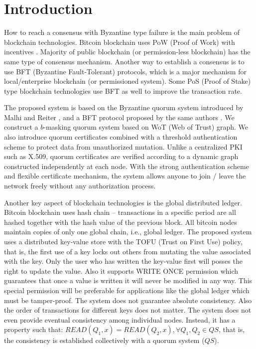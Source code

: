 \section{Introduction}
How to reach a consensus with Byzantine type failure is the main
problem of blockchain technologies. Bitcoin blockchain uses PoW (Proof
of Work) with incentives \cite{bitcoin}. Majority of public blockchain
(or permission-less blockchain) has the same type of consensus
mechanism. Another way to establish a consensus is to use BFT
(Byzantine Fault-Tolerant) protocols, which is a major mechanism for
local/enterprise blockchain (or permissioned system). Some PoS (Proof
of Stake) type blockchain technologies use BFT as well to improve the
transaction rate.

The proposed system is based on the Byzantine quorum system introduced
by Malhi and Reiter \cite{Delhi:1}, and a BFT protocol proposed by the
same authors \cite{Delhi:2}. We construct a $b$-masking quorum system
based on WoT (Web of Trust) graph. We also introduce quorum
certificates combined with a threshold authentication scheme to
protect data from unauthorized mutation. Unlike a centralized PKI such
as X.509, quorum certificates are verified according to a dynamic
graph constructed independently at each node. With the strong
authentication scheme and flexible certificate mechanism, the system
allows anyone to join / leave the network freely without any
authorization process.

Another key aspect of blockchain technologies is the global
distributed ledger. Bitcoin blockchain uses hash chain -- transactions
in a specific period are all hashed together with the hash value of
the previous block. All bitcoin nodes maintain copies of only one
global chain, i.e., global ledger.
The proposed system uses a distributed key-value store with the TOFU
(Trust on First Use) policy, that is, the first use of a key locks out
others from mutating the value associated with the key. Only the
user who has written the key-value first will posses the right to
update the value. Also it supports WRITE ONCE permission which
guarantees that once a value is written it will never be modified in
any way. This special permission will be preferable for applications
like the global ledger which must be tamper-proof.
The system does not guarantee absolute consistency. Also the order of
transactions for different keys does not matter. The system does not
even provide eventual consistency among individual nodes. Instead, it
has a property such that: $READ(Q_1, x) = READ(Q_2, x), \forall Q_1,
Q_2 \in QS$, that is, the consistency is established collectively with
a quorum system ($QS$).

